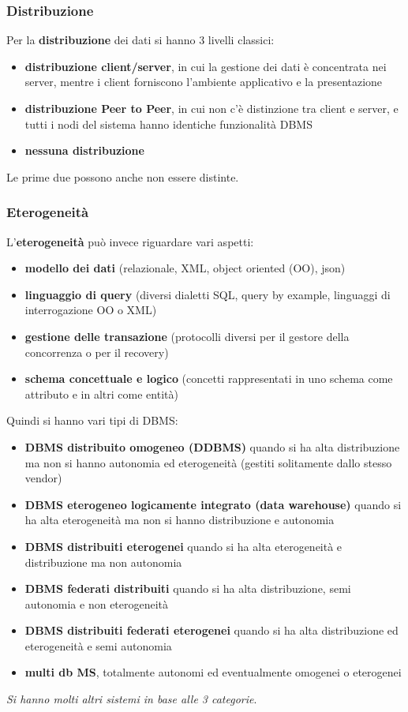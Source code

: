 \documentclass[a4paper,12pt, oneside]{book}
\begin{document}
\subsubsection{Distribuzione}
Per la\textbf{ distribuzione} dei dati si hanno 3 livelli classici:
\begin{itemize}
  \item \textbf{distribuzione client/server}, in cui la gestione dei dati è
  concentrata nei server, mentre i client forniscono l'ambiente applicativo e la
  presentazione
  \item \textbf{distribuzione Peer to Peer}, in cui non c'è distinzione tra
  client e server, e tutti i nodi del sistema hanno identiche funzionalità DBMS
  \item \textbf{nessuna distribuzione}
\end{itemize}
Le prime due possono anche non essere distinte.
\subsubsection{Eterogeneità}
L'\textbf{eterogeneità} può invece riguardare vari aspetti:
\begin{itemize}
  \item \textbf{modello dei dati} (relazionale, XML, object oriented (OO), json)
  \item \textbf{linguaggio di query} (diversi dialetti SQL, query by example,
  linguaggi di interrogazione OO o XML)
  \item \textbf{gestione delle transazione} (protocolli diversi per il gestore
  della concorrenza o per il recovery)
  \item \textbf{schema concettuale e logico} (concetti rappresentati in uno
  schema come attributo e in altri come entità)
\end{itemize}
Quindi si hanno vari tipi di DBMS:
\begin{itemize}
  \item \textbf{DBMS distribuito omogeneo (DDBMS)} quando si ha alta
  distribuzione ma non si hanno autonomia ed eterogeneità (gestiti solitamente
  dallo stesso vendor)
  \item \textbf{DBMS eterogeneo logicamente integrato (data warehouse)} quando
  si ha alta eterogeneità ma non si hanno distribuzione e autonomia
  \item \textbf{DBMS distribuiti eterogenei} quando si ha alta eterogeneità e
  distribuzione ma non autonomia 
  \item \textbf{DBMS federati distribuiti} quando si ha alta
  distribuzione, semi autonomia e non eterogeneità
  \item \textbf{DBMS distribuiti federati eterogenei} quando si ha alta
  distribuzione ed eterogeneità e semi autonomia
  \item \textbf{multi db MS}, totalmente autonomi ed eventualmente omogenei o
  eterogenei 
\end{itemize}
\textit{Si hanno molti altri sistemi in base alle 3 categorie}.\\
\end{document}
